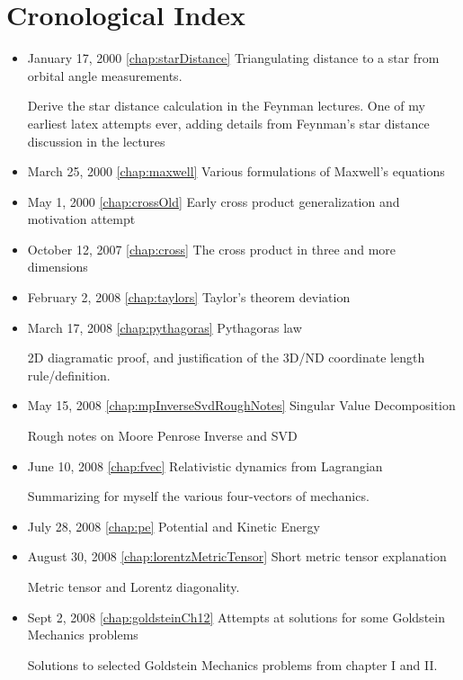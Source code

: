 \chapter{Cronological Index}
\label{chap:Cronology}

\begin{itemize}

\item January 17, 2000 \ref{chap:starDistance} Triangulating distance to a star from orbital angle measurements.

Derive the star distance calculation in the Feynman lectures.  One of my earliest latex attempts ever, adding details from Feynman's star distance discussion in the lectures\item March 25, 2000 \ref{chap:maxwell} Various formulations of Maxwell's equations

\item May 1, 2000 \ref{chap:crossOld} Early cross product generalization and motivation attempt

\item October 12, 2007 \ref{chap:cross} The cross product in three and more dimensions

\item February 2, 2008 \ref{chap:taylors} Taylor's theorem deviation

\item March 17, 2008 \ref{chap:pythagoras} Pythagoras law

2D diagramatic proof, and justification of the 3D/ND coordinate length rule/definition.\item May 15, 2008 \ref{chap:mpInverseSvdRoughNotes} Singular Value Decomposition

Rough notes on Moore Penrose Inverse and SVD\item June 10, 2008 \ref{chap:fvec} Relativistic dynamics from Lagrangian

Summarizing for myself the various four-vectors of mechanics.\item July 28, 2008 \ref{chap:pe} Potential and Kinetic Energy

\item August 30, 2008 \ref{chap:lorentzMetricTensor} Short metric tensor explanation

Metric tensor and Lorentz diagonality.\item Sept 2, 2008 \ref{chap:goldsteinCh12} Attempts at solutions for some Goldstein Mechanics problems

Solutions to selected Goldstein Mechanics problems from chapter I and II.


\end{itemize}
